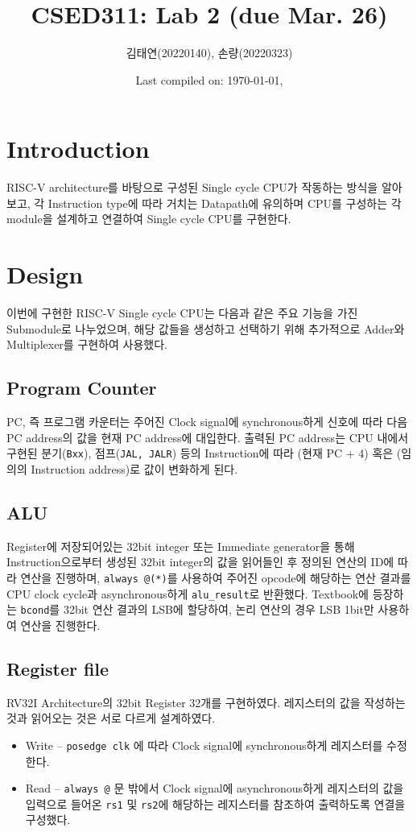 \documentclass{scrartcl}
\title{CSED311: Lab 2 (due Mar. 26)}
\author{김태연(20220140), 손량(20220323)}
\date{Last compiled on: \today, \currenttime}
\begin{document}
\maketitle

\section{Introduction}
RISC-V architecture를 바탕으로 구성된 Single cycle CPU가 작동하는 방식을 알아보고,
각 Instruction type에 따라 거치는 Datapath에 유의하며 CPU를 구성하는 각 module을
설계하고 연결하여 Single cycle CPU를 구현한다.

\section{Design}
이번에 구현한 RISC-V Single cycle CPU는 다음과 같은 주요 기능을 가진 Submodule로 나누었으며, 해당 값들을
생성하고 선택하기 위해 추가적으로 Adder와 Multiplexer를 구현하여 사용했다.

\subsection{Program Counter}
PC, 즉 프로그램 카운터는 주어진 Clock signal에 synchronous하게 신호에 따라 다음 PC address의 값을
현재 PC address에 대입한다. 출력된 PC address는 CPU 내에서 구현된 분기(\texttt{Bxx}),
점프(\texttt{JAL, JALR}) 등의 Instruction에 따라 (현재 PC + 4) 혹은 (임의의 Instruction address)로
값이 변화하게 된다.

\subsection{ALU}
Register에 저장되어있는 32bit integer 또는 Immediate generator을 통해 Instruction으로부터
생성된 32bit integer의 값을 읽어들인 후 정의된 연산의 ID에 따라 연산을 진행하며,
\texttt{always @(*)}를 사용하여 주어진 opcode에 해당하는 연산 결과를
CPU clock cycle과 asynchronous하게 \texttt{alu\_result}로 반환했다.
Textbook에 등장하는 \texttt{bcond}를 32bit 연산 결과의 LSB에 할당하여, 논리 연산의 경우
LSB 1bit만 사용하여 연산을 진행한다.

\subsection{Register file}
RV32I Architecture의 32bit Register 32개를 구현하였다. 레지스터의 값을 작성하는 것과 읽어오는 것은
서로 다르게 설계하였다.

\begin{itemize}
    \item Write -- \texttt{posedge clk} 에 따라 Clock signal에 synchronous하게
    레지스터를 수정한다.
    \item Read -- \texttt{always @} 문 밖에서 Clock signal에 asynchronous하게 
    레지스터의 값을 입력으로 들어온 \texttt{rs1} 및 \texttt{rs2}에 해당하는 레지스터를
    참조하여 출력하도록 연결을 구성했다.
\end{itemize}
\end{document}
